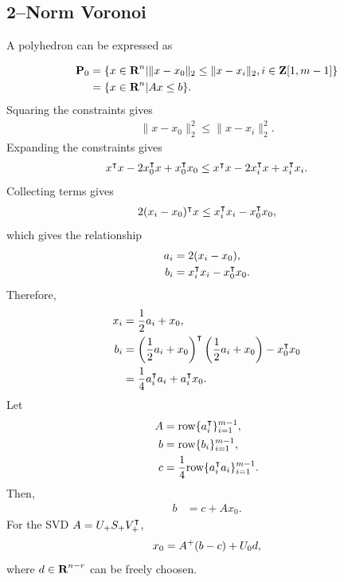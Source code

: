 \documentclass{article}
\begin{document}
    \clearpage

\subsection{2--Norm Voronoi}

    A polyhedron can be expressed as \cite[p.~60]{bv_cvxbook}

    \begin{align*}
        \textbf{P}_0&=\{x\in\textbf{R}^n| \|x-x_0\|_2\leq\|x-x_i\|_2, i\in\textbf{Z}[1,m-1]  \}\\
        &=\{x\in\textbf{R}^n|Ax\leq b\}.
    \end{align*}
    Squaring the constraints gives
    \begin{align*}
        \|x-x_0\|_2^2\leq\|x-x_i\|_2^2.
    \end{align*}
    Expanding the constraints gives
    \begin{align*}
        x^\intercal x-2x_0^\intercal x+x_0^\intercal x_0 \leq x^\intercal x - 2 x_i^\intercal x + x_i^\intercal x_i.
    \end{align*}
    Collecting terms gives
    \begin{align*}
        2(x_i-x_0)^\intercal x \leq x_i^\intercal x_i-x_0^\intercal x_0,
    \end{align*}
    which gives the relationship
    \begin{align*}
        a_i&=2(x_i-x_0),\\
        b_i&=x_i^\intercal x_i-x_0^\intercal x_0.
    \end{align*}
    Therefore,
    \begin{align*}
        x_i&=\frac{1}{2}a_i+x_0,\\
        b_i&=\left(\frac{1}{2}a_i+x_0\right)^\intercal \left(\frac{1}{2}a_i+x_0\right)-x_0^\intercal x_0\\
        &=\frac{1}{4}a_i^\intercal a_i+a_i^\intercal x_0.
    \end{align*}
    Let 
    \begin{align*}
        A&=\text{row}\{a_i^\intercal\}_{i=1}^{m-1},\\
        b&=\text{row}\{b_i\}_{i=1}^{m-1},\\
        c&=\frac{1}{4}\text{row}\{a_i^\intercal a_i\}_{i=1}^{m-1}.
    \end{align*}
    Then,
    \begin{align*}
        b&=c+Ax_0.
    \end{align*}
    For the SVD $A=U_+S_+V_+^\intercal$,
    \begin{align*}
        x_0=A^+(b-c)+U_0 d,
    \end{align*}
    where $d\in\textbf{R}^{n-r}$ can be freely choosen.
\end{document}
